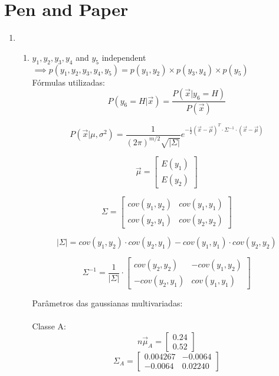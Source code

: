 \documentclass[a4paper,12pt]{article} %
\begin{document}
\section*{Pen and Paper}
\begin{enumerate}

\item 
\begin{enumerate}
\item
${y_1,y_2} , {y_3,y_4}$ and $y_5$ independent $\implies p(y_1,y_2,y_3,y_4,y_5) = p(y_1,y_2)\times p(y_3,y_4)\times p(y_5)$ \\

Fórmulas utilizadas:
\begin{equation}
    P(y_6=H|\vec{x}) = \frac{P(\vec{x}|y_6=H)}{P(\vec{x})}
\end{equation}

\begin{equation}
    P(\vec{x}|\mu, \sigma^2) = \frac{1}{(2\pi)^{m/2} \sqrt{|\Sigma|}}e^{-\frac{1}{2}(\vec{x}-\vec{\mu})^T \cdot \Sigma^{-1} \cdot (\vec{x}-\vec{\mu})}
\end{equation}

\begin{equation}
    \vec{\mu} = \begin{bmatrix} E(y_1) \\ E(y_2)  \end{bmatrix}
\end{equation}

\begin{equation}
    \Sigma = \begin{bmatrix} cov(y_1,y_2) & cov(y_1,y_1) \\ cov(y_2,y_1) & cov(y_2,y_2) \end{bmatrix}
\end{equation}

\begin{equation}
    |\Sigma| = cov(y_1,y_2) \cdot cov(y_2,y_1) - cov(y_1,y_1) \cdot cov(y_2,y_2)
\end{equation}

\begin{equation}
    \Sigma^{-1} =  \frac{1}{|\Sigma|} \cdot \begin{bmatrix} cov(y_2,y_2) & -cov(y_1,y_2) \\ -cov(y_2,y_1) & cov(y_1,y_1) \end{bmatrix} 
\end{equation}

Parâmetros das gaussianas multivariadas: \\ \\
Classe A:
\begin{equation*} 
    n\vec{\mu}_A = \begin{bmatrix} 0.24 \\ 0.52 \end{bmatrix} 
\end{equation*}
\begin{equation*} 
    \Sigma_A = \begin{bmatrix} 0.004267 & -0.0064 \\ -0.0064 & 0.02240 \end{bmatrix}
\end{equation*}


\end{enumerate}
\end{enumerate}
\end{document}
